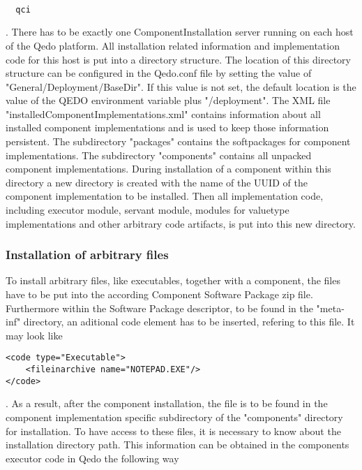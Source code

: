\documentclass[12pt,a4paper]{report}
\begin{document}
\small
\begin{verbatim}

  qci

\end{verbatim}
\normalsize

. There has to be exactly one ComponentInstallation server running on each host of the Qedo platform. All installation related information and implementation code for this host is put into a directory structure. The location of this directory structure can be configured in the Qedo.conf file by setting the value of "General/Deployment/BaseDir". If this value is not set, the default location is the value of the QEDO environment variable plus "/deployment". The XML file "installedComponentImplementations.xml" contains information about all installed component implementations and is used to keep those information persistent. The subdirectory "packages" contains the softpackages for component implementations. The subdirectory "components" contains all unpacked component implementations. During installation of a component within this directory a new directory is created with the name of the UUID of the component implementation to be installed. Then all implementation code, including executor module, servant module, modules for valuetype implementations and other arbitrary code artifacts, is put into this new directory.

\subsubsection{Installation of arbitrary files}
\label{sec:Installation of arbitrary code}

To install arbitrary files, like executables, together with a component, the files have to be put into the according Component Software Package zip file. Furthermore within the Software Package descriptor, to be found in the "meta-inf" directory, an aditional code element has to be inserted, refering to this file. It may look like
\begin{verbatim}
<code type="Executable">
    <fileinarchive name="NOTEPAD.EXE"/>
</code>
\end{verbatim}

. As a result, after the component installation, the file is to be found in the component implementation specific subdirectory of the "components" directory for installation. To have access to these files, it is necessary to know about the installation directory path. This information can be obtained in the components executor code in Qedo the following way
\end{document}
